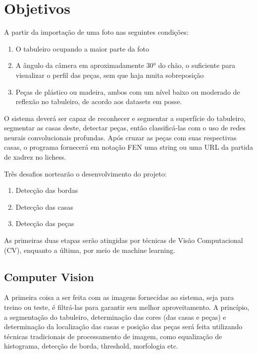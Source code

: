 \documentclass[a4paper,12pt,twoside]{article}
\begin{document}
\section{Objetivos}
A partir da importação de uma foto nas seguintes condições:

\begin{enumerate}
    \item{O tabuleiro ocupando a maior parte da foto}
    \item{A ângulo da câmera em aproximadamente 30° do chão,
          o suficiente para visualizar o perfil das peças, sem que haja muita sobreposição}
    \item{Peças de plástico ou madeira, ambos com um nível baixo ou moderado de reflexão no tabuleiro,
          de acordo aos datasets em posse.}
\end{enumerate}

O sistema deverá ser capaz de reconhecer e segmentar a superfície do tabuleiro,
segmentar as casas deste, detectar peças,
então classificá-las com o uso de redes neurais convolucionais profundas.
Após cruzar as peças com suas respectivas casas,
o programa fornecerá em notação FEN uma string ou uma URL da partida de xadrez no lichess.

Três desafios nortearão o desenvolvimento do projeto:

\begin{enumerate}
    \item{Detecção das bordas}
    \item{Detecção das casas}
    \item{Detecção das peças}
\end{enumerate}

As primeiras duas etapas serão atingidas por técnicas de Visão Computacional (CV),
enquanto a última, por meio de machine learning.

\subsection{Computer Vision}

A primeira coisa a ser feita com as imagens fornecidas ao sistema,
seja para treino ou teste, é filtrá-las para garantir seu melhor aproveitamento.
A princípio, a segmentação do tabuleiro,
determinação das cores (das casas e peças) e determinação da localização das casas e posição das peças
será feita utilizando técnicas tradicionais de processamento de imagem,
como equalização de histograma, detecção de borda, threshold, morfologia etc.
\end{document}

